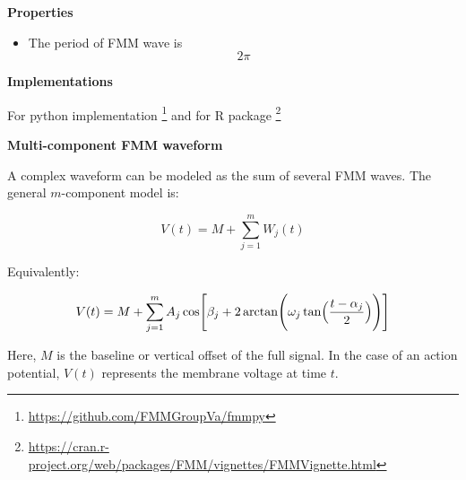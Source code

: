 \documentclass{book}
\providecommand{\ProjectDeepHeading}[2]{%
    \par\medskip\noindent\textbf{#2}\par\smallskip
}
\providecommand{\seeherefooter}[1]{\footnote{\url{#1}}}
\begin{document}
    
    \ProjectDeepHeading{10}{Properties}
        \begin{itemize}
            \item The period of FMM wave is $$2\ensuremath{\pi}$$
        \end{itemize}
    
    
    \ProjectDeepHeading{10}{Implementations}
        For python implementation \seeherefooter{https://github.com/FMMGroupVa/fmmpy} and for R package \seeherefooter{https://cran.r-project.org/web/packages/FMM/vignettes/FMMVignette.html}


\ProjectDeepHeading{11}{Multi-component FMM waveform}
    
    A complex waveform can be modeled as the sum of several FMM waves.
    The general $m$-component model is:
    
    \begin{equation}
        V(t)
        =
        M
        +
        \sum_{j=1}^{m}
        W_j(t)
    \end{equation}
    
    Equivalently:
    
    \begin{equation}
        V(t)
        =
        M
        +
        \sum_{j=1}^{m}
        A_j
        \cos
        \Biggl[
            \ensuremath{\beta}_j
            +
            2
            \arctan
            \Biggl(
            \ensuremath{\omega}_j
            \tan
            \Bigl(
            \frac{t-\ensuremath{\alpha}_j}{2}
            \Bigr)
            \Biggr)
            \Biggr]
    \end{equation}
    
    Here, $M$ is the baseline or vertical offset of the full signal.
    In the case of an action potential, $V(t)$ represents the membrane voltage at time $t$.
    \cite{rueda-2021-a-novel-wave-decomposition-for-oscillatory-signals}

\end{document}
